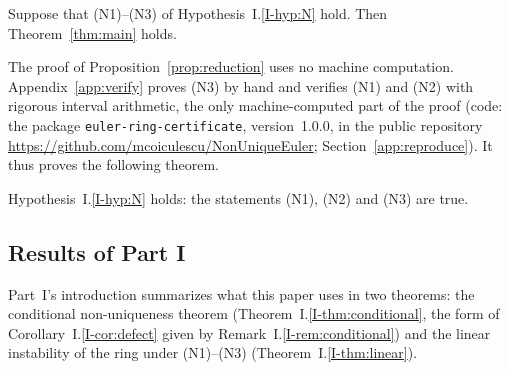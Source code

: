 \begin{proposition}
\label{prop:reduction}
Suppose that \textup{(N1)}--\textup{(N3)} of Hypothesis~I.\ref{I-hyp:N} hold. Then
Theorem~\ref{thm:main} holds.
\end{proposition}

The proof of Proposition~\ref{prop:reduction} uses no machine computation.
Appendix~\ref{app:verify} proves \textup{(N3)} by hand and verifies
\textup{(N1)} and \textup{(N2)} with rigorous interval arithmetic, the only
machine-computed part of the proof (code: the package
\texttt{euler-ring-certificate}, version~1.0.0, in the public repository
\url{https://github.com/mcoiculescu/NonUniqueEuler};
Section~\ref{app:reproduce}). It thus proves the following theorem.

\begin{theorem}
\label{thm:N-holds}
Hypothesis~I.\ref{I-hyp:N} holds: the statements \textup{(N1)}, \textup{(N2)} and
\textup{(N3)} are true.
\end{theorem}

\subsection{Results of Part I}
\label{sec:II-partI}

Part~I's introduction summarizes what this paper uses in two theorems: the
conditional non-uniqueness theorem (Theorem~I.\ref{I-thm:conditional}, the form
of Corollary~I.\ref{I-cor:defect} given by Remark~I.\ref{I-rem:conditional}) and
the linear instability of the ring under \textup{(N1)}--\textup{(N3)}
(Theorem~I.\ref{I-thm:linear}).


